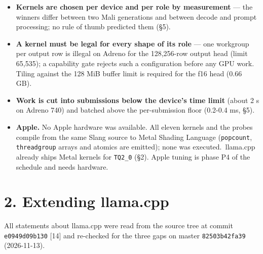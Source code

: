 \documentclass[
  10pt,
]{article}
\newcounter{none} %
\providecommand{\tightlist}{%
  \setlength{\itemsep}{0pt}\setlength{\parskip}{0pt}}
\begin{document}
\begin{itemize}
\tightlist%
\item
  \textbf{Kernels are chosen per device and per role by measurement} ---
  the winners differ between two Mali generations and between decode and
  prompt processing; no rule of thumb predicted them (\S{}5).
\item
  \textbf{A kernel must be legal for every shape of its role} --- one
  workgroup per output row is illegal on Adreno for the 128,256-row
  output head (limit 65,535); a capability gate rejects such a
  configuration before any GPU work. Tiling against the 128 MiB buffer
  limit is required for the f16 head (0.66 GB).
\item
  \textbf{Work is cut into submissions below the device's time limit}
  (about 2 s on Adreno 740) and batched above the per-submission floor
  (0.2-0.4 ms, \S{}5).
\item
  \textbf{Apple.} No Apple hardware was available. All eleven kernels
  and the probes compile from the same Slang source to Metal Shading
  Language (\texttt{popcount}, \texttt{threadgroup} arrays and atomics
  are emitted); none was executed.\ llama.cpp already ships Metal kernels
  for \texttt{TQ2\_0} (\S{}2). Apple tuning is phase P4 of the schedule and
  needs hardware.
\end{itemize}

\section{2. Extending llama.cpp}\label{extending-llama.cpp}

All statements about llama.cpp were read from the source tree at commit
\texttt{e0949d09b130} [14] and re-checked for the three gaps on
master \texttt{82503b42fa39} (2026-11-13).
\end{document}
